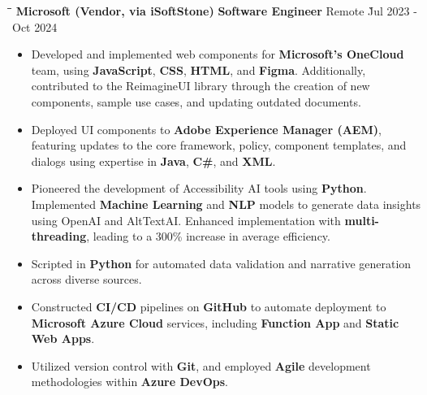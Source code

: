 \documentclass{res}
\begin{document}
\begin{resume}
    \vspace{-0.1in}	
    \begin{tabbing}
    \hspace{2.8in}\= \hspace{1.8in}\= \hspace{1.2in}\= \kill %
    {\bf Microsoft (Vendor, via iSoftStone)} \> {\bf Software Engineer}  \>  
                                    Remote    \` Jul 2023 - Oct 2024\\
    \end{tabbing}\vspace{-20pt}      %
    \vspace{+0.1in}
    \begin{itemize} \itemsep 1.5pt %
    \item Developed and implemented web components for {\bf Microsoft's OneCloud} team, using {\bf JavaScript}, 
        {\bf CSS}, {\bf HTML}, and {\bf Figma}. Additionally, contributed to the ReimagineUI library 
        through the creation of new components, sample use cases, and updating outdated documents.
    \item Deployed UI components to {\bf Adobe Experience Manager (AEM)}, featuring updates to the core framework, 
        policy, component templates, and dialogs using expertise in {\bf Java}, {\bf C\#}, and {\bf XML}.
    \item Pioneered the development of Accessibility AI tools using {\bf Python}. 
        Implemented {\bf Machine Learning} and {\bf NLP} models to generate data insights using OpenAI and AltTextAI.
        Enhanced implementation with {\bf multi-threading}, leading to a 300\% increase in average efficiency.
    \item Scripted in {\bf Python} for automated data validation and narrative generation across diverse sources.
    \item Constructed {\bf CI/CD} pipelines on {\bf GitHub} to automate deployment to 
        {\bf Microsoft Azure Cloud} services, including {\bf Function App} and {\bf Static Web Apps}.
    \item Utilized version control with {\bf Git}, and employed {\bf Agile} 
        development methodologies within {\bf Azure DevOps}.
    \end{itemize}



\end{resume}
\end{document}
